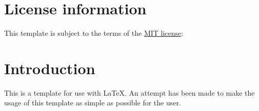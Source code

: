 

\section{License information}

This template is subject to the terms of the \href{https://opensource.org/licenses/mit-license.php}{MIT license}:

\begin{figure}[H]
    \scriptsize
\end{figure}

\section{Introduction}

This is a template for use with \LaTeX{}. An attempt has been made to make
the usage of this template as simple as possible for the user.


